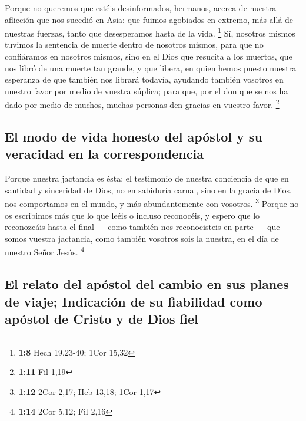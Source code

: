  Porque no queremos que estéis desinformados, hermanos,
acerca de nuestra aflicción que nos sucedió en Asia: que fuimos
agobiados en extremo, más allá de nuestras fuerzas, tanto que
desesperamos hasta de la vida. \footnote{\textbf{1:8} Hech 19,23-40;
  1Cor 15,32}  Sí, nosotros mismos tuvimos la sentencia de
muerte dentro de nosotros mismos, para que no confiáramos en nosotros
mismos, sino en el Dios que resucita a los muertos,  que
nos libró de una muerte tan grande, y que libera, en quien hemos puesto
nuestra esperanza de que también nos librará todavía, 
ayudando también vosotros en nuestro favor por medio de vuestra súplica;
para que, por el don que se nos ha dado por medio de muchos, muchas
personas den gracias en vuestro favor. \footnote{\textbf{1:11} Fil 1,19}

\hypertarget{el-modo-de-vida-honesto-del-apuxf3stol-y-su-veracidad-en-la-correspondencia}{%
\subsection{El modo de vida honesto del apóstol y su veracidad en la
correspondencia}\label{el-modo-de-vida-honesto-del-apuxf3stol-y-su-veracidad-en-la-correspondencia}}

 Porque nuestra jactancia es ésta: el testimonio de
nuestra conciencia de que en santidad y sinceridad de Dios, no en
sabiduría carnal, sino en la gracia de Dios, nos comportamos en el
mundo, y más abundantemente con vosotros. \footnote{\textbf{1:12} 2Cor
  2,17; Heb 13,18; 1Cor 1,17}  Porque no os escribimos
más que lo que leéis o incluso reconocéis, y espero que lo reconozcáis
hasta el final ---  como también nos reconocisteis en
parte --- que somos vuestra jactancia, como también vosotros sois la
nuestra, en el día de nuestro Señor Jesús. \footnote{\textbf{1:14} 2Cor
  5,12; Fil 2,16}

\hypertarget{el-relato-del-apuxf3stol-del-cambio-en-sus-planes-de-viaje-indicaciuxf3n-de-su-fiabilidad-como-apuxf3stol-de-cristo-y-de-dios-fiel}{%
\subsection{El relato del apóstol del cambio en sus planes de viaje;
Indicación de su fiabilidad como apóstol de Cristo y de Dios
fiel}\label{el-relato-del-apuxf3stol-del-cambio-en-sus-planes-de-viaje-indicaciuxf3n-de-su-fiabilidad-como-apuxf3stol-de-cristo-y-de-dios-fiel}}

